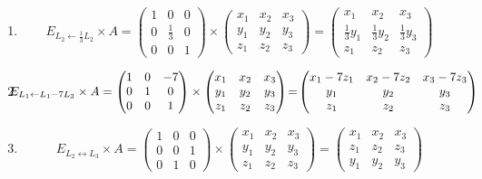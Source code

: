 \documentclass[class=report,crop=false]{standalone}
\begin{document}
\begin{exemple}
\sauteligne
\begin{enumerate}
    \item
$$E_{L_2 \leftarrow \frac13 L_2}  \times A
= \begin{pmatrix}
  1&0&0\\0&\frac13&0\\0&0&1
  \end{pmatrix}
  \times
  \begin{pmatrix}
  x_1&x_2&x_3\\y_1&y_2&y_3\\z_1&z_2&z_3
  \end{pmatrix}
  =   \begin{pmatrix}
  x_1&x_2&x_3\\ \frac13y_1&\frac13y_2&\frac13y_3\\z_1&z_2&z_3
  \end{pmatrix}
$$

  \item
$$\hspace*{-1.1em}E_{L_1 \leftarrow L_1-7 L_3}  \times A
= \begin{pmatrix}
  1&0&-7\\0&1&0\\0&0&1
  \end{pmatrix}
  \times
  \begin{pmatrix}
  x_1&x_2&x_3\\y_1&y_2&y_3\\z_1&z_2&z_3
  \end{pmatrix}
  \!=\!   \begin{pmatrix}
  x_1-7z_1&x_2-7z_2&x_3-7z_3\\ y_1&y_2&y_3\\z_1&z_2&z_3
  \end{pmatrix}
$$

   \item
$$E_{L_2 \leftrightarrow L_3}  \times A
= \begin{pmatrix}
  1&0&0\\0&0&1\\0&1&0
  \end{pmatrix}
  \times
  \begin{pmatrix}
  x_1&x_2&x_3\\y_1&y_2&y_3\\z_1&z_2&z_3
  \end{pmatrix}
  =   \begin{pmatrix}
  x_1&x_2&x_3\\z_1&z_2&z_3\\ y_1&y_2&y_3
  \end{pmatrix}
$$
\end{enumerate}
\end{exemple}
\end{document}
